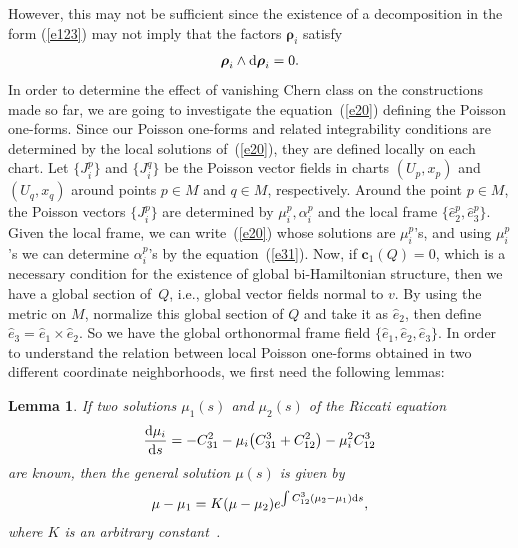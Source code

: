 \documentclass[10pt,a4paper]{amsart}
\numberwithin{equation}{section}
\newtheorem{Lemma}[Theorem]{Lemma}
\begin{document}
However, this may not be suf\/f\/icient since the existence of a decomposition in the form (\ref{e123}) may not imply that the factors $\boldsymbol{\rho }_{i}$ satisfy
\begin{gather*}
\boldsymbol{\rho }_{i}\wedge {\rm d}\boldsymbol{\rho }_{i}=0.
\end{gather*}
In order to determine the ef\/fect of vanishing Chern class on the constructions made so far, we are going to investigate the equation~(\ref{e20}) def\/ining the Poisson one-forms. Since our Poisson one-forms and related integrability conditions are determined by the local solutions of~(\ref{e20}), they are def\/ined locally on each chart. Let $\big\{ J_{i}^{p}\big\} $ and $\big\{ J_{i}^{q}\big\} $ be the Poisson vector f\/ields in charts $( U_{p},x _{p}) $ and $ ( U_{q},x _{q}) $ around points $p\in M$ and $q\in M$, respectively. Around the point $p\in M$, the Poisson vectors $\big\{ J_{i}^{p}\big\} $ are determined by $\mu _{i}^{p},\alpha _{i}^{p}$ and the local frame $\big\{ \widehat{e}_{2}^{p}, \widehat{e}_{3}^{p}\big\} $. Given the local frame, we can write~(\ref{e20}) whose solutions are $\mu _{i}^{p}$'s, and using $\mu _{i}^{p}$'s we can determine $\alpha _{i}^{p}$'s by the equation~(\ref{e31}). Now, if $\boldsymbol{c}_{1}(Q) =0$, which is a necessary condition for the existence of global bi-Hamiltonian structure, then we have a global section of~$Q$, i.e., global vector f\/ields normal to $v$. By using the metric on $M$, normalize this global section of $Q$ and take it as $\widehat{e}_{2}$, then def\/ine $\widehat{e}_{3}=\widehat{e}_{1}\times \widehat{e}_{2}$. So we have the global orthonormal frame f\/ield $\{ \widehat{e}_{1},\widehat{e}_{2},\widehat{e}_{3}\} $. In order to understand the relation between local Poisson one-forms obtained in two dif\/ferent coordinate neighborhoods, we f\/irst need the following lemmas:

\begin{Lemma}\label{lemma3}
If two solutions $\mu _{1}(s) $ and $\mu _{2}(s) $ of the Riccati equation
\begin{gather*}
\frac{{\rm d}\mu _{i}}{{\rm d}s}=-C_{31}^{2}-\mu _{i}\big( C_{31}^{3}+C_{12}^{2}\big) -\mu _{i}^{2}C_{12}^{3}
\end{gather*}
are known, then the general solution $\mu (s) $ is given by
\begin{gather*}
\mu -\mu _{1}=K ( \mu -\mu _{2} ) e^{\int C_{12}^{3}(\mu _{2}-\mu _{1}) {\rm d}s},
\end{gather*}
where $K$ is an arbitrary constant~{\rm \cite{Ince}}.
\end{Lemma}
\end{document}
